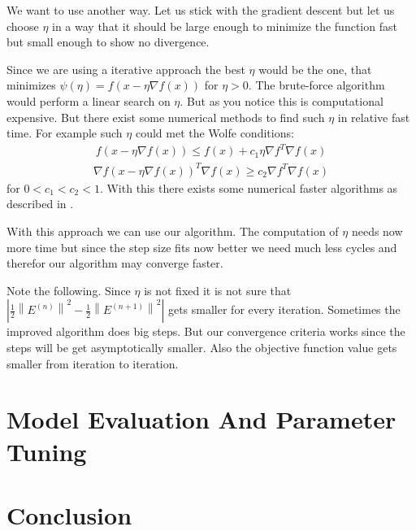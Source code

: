 \documentclass[DIV=14,twocolumn]{scrartcl}
\newcommand{\norm}[1]{\left\lVert#1\right\rVert}
\begin{document}
We want to use another way. Let us stick with the gradient descent but let us choose $\eta$ in a way that it should be large enough to minimize the function fast but small enough to show no divergence. 

Since we are using a iterative approach the best $\eta$ would be the one, that minimizes $\psi(\eta) = f(x-\eta\nabla f(x))$ for $\eta > 0$. The brute-force algorithm would perform a linear search on $\eta$. But as you notice this is computational expensive.  But there exist some numerical methods to find such $\eta$ in relative fast time. For example such $\eta$ could met the Wolfe conditions:
\begin{equation*}
\begin{split}
f(x-\eta\nabla f(x)) \leq f(x) + c_1\eta\nabla f^T\nabla f(x)
\end{split}
\end{equation*}
\begin{equation*}
\begin{split}
\nabla f(x-\eta\nabla f(x))^T\nabla f(x) \geq c_2\nabla f^T\nabla f(x)
\end{split}
\end{equation*}
for $0 < c_1 < c_2 < 1$.
With this there exists some numerical faster algorithms as described in \cite{NoWr06}.

With this approach we can use our algorithm. The computation of $\eta$ needs now more time but since the step size fits now better we need much less cycles and therefor our algorithm may converge faster. 

Note the following. Since $\eta$ is not fixed it is not sure that $|\frac{1}{2}\norm{E^{(n)}}^2-\frac{1}{2}\norm{E^{(n+1)}}^2|$ gets smaller for every iteration. Sometimes the improved algorithm does big steps. But our convergence criteria works since the steps will be get asymptotically smaller. Also the objective function value gets smaller from iteration to iteration. 

\section{Model Evaluation And Parameter Tuning}

\section{Conclusion}
{}

\end{document}
